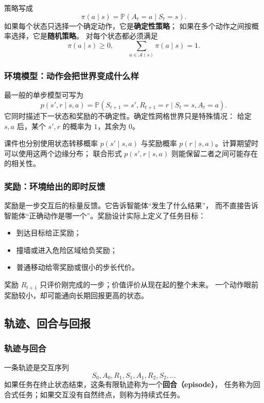 \documentclass[11pt,a4paper,fontset=fandol]{ctexart}
\newcommand{\Aset}{\mathcal{A}}
\newcommand{\Prob}{\mathbb{P}}
\begin{document}
策略写成
\[
\pi(a\mid s)=\Prob(A_t=a\mid S_t=s).
\]
如果每个状态只选择一个确定动作，它是\textbf{确定性策略}；
如果在多个动作之间按概率选择，它是\textbf{随机策略}。
对每个状态都必须满足
\[
\pi(a\mid s)\geq 0,
\qquad
\sum_{a\in\Aset(s)}\pi(a\mid s)=1.
\]

\subsubsection{环境模型：动作会把世界变成什么样}

最一般的单步模型可写为
\[
p(s',r\mid s,a)
=\Prob(S_{t+1}=s',R_{t+1}=r\mid S_t=s,A_t=a).
\]
它同时描述下一状态和奖励的不确定性。确定性网格世界只是特殊情况：
给定 \(s,a\) 后，某个 \(s',r\) 的概率为 \(1\)，其余为 \(0\)。

课件也分别使用状态转移概率 \(p(s'\mid s,a)\) 与奖励概率
\(p(r\mid s,a)\)。计算期望时可以使用这两个边缘分布；
联合形式 \(p(s',r\mid s,a)\) 则能保留二者之间可能存在的相关性。

\subsubsection{奖励：环境给出的即时反馈}

奖励是一步交互后的标量反馈。它告诉智能体“发生了什么结果”，
而不直接告诉智能体“正确动作是哪一个”。奖励设计实际上定义了任务目标：

\begin{itemize}
  \item 到达目标给正奖励；
  \item 撞墙或进入危险区域给负奖励；
  \item 普通移动给零奖励或很小的步长代价。
\end{itemize}

\begin{warningbox}[奖励不是价值]
奖励 \(R_{t+1}\) 只评价刚完成的一步；价值评价从现在起的整个未来。
一个动作眼前奖励较小，却可能通向长期回报更高的状态。
\end{warningbox}

\subsection{轨迹、回合与回报}

\subsubsection{轨迹与回合}

一条轨迹是交互序列
\[
S_0,A_0,R_1,S_1,A_1,R_2,S_2,\ldots
\]
如果任务在终止状态结束，这条有限轨迹称为一个\textbf{回合（episode）}，
任务称为回合式任务；如果交互没有自然终点，则称为持续式任务。
\end{document}
